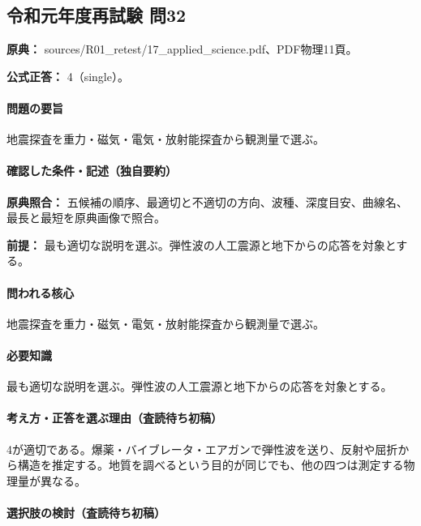 \subsection{令和元年度再試験 問32}
\label{q:r01-ret-applied-32}

\noindent\textbf{原典：} sources/R01\_retest/17\_applied\_science.pdf、PDF物理11頁。

\textbf{公式正答：} 4（single）。

\paragraph{問題の要旨} 地震探査を重力・磁気・電気・放射能探査から観測量で選ぶ。

\paragraph{確認した条件・記述（独自要約）}\mbox{}\par

\noindent\textbf{原典照合：} 五候補の順序、最適切と不適切の方向、波種、深度目安、曲線名、最長と最短を原典画像で照合。\par

\noindent\textbf{前提：} 最も適切な説明を選ぶ。弾性波の人工震源と地下からの応答を対象とする。\par

\paragraph{問われる核心} 地震探査を重力・磁気・電気・放射能探査から観測量で選ぶ。

\paragraph{必要知識} 最も適切な説明を選ぶ。弾性波の人工震源と地下からの応答を対象とする。

\paragraph{考え方・正答を選ぶ理由（査読待ち初稿）} 4が適切である。爆薬・バイブレータ・エアガンで弾性波を送り、反射や屈折から構造を推定する。地質を調べるという目的が同じでも、他の四つは測定する物理量が異なる。

\paragraph{選択肢の検討（査読待ち初稿）}\mbox{}\par

